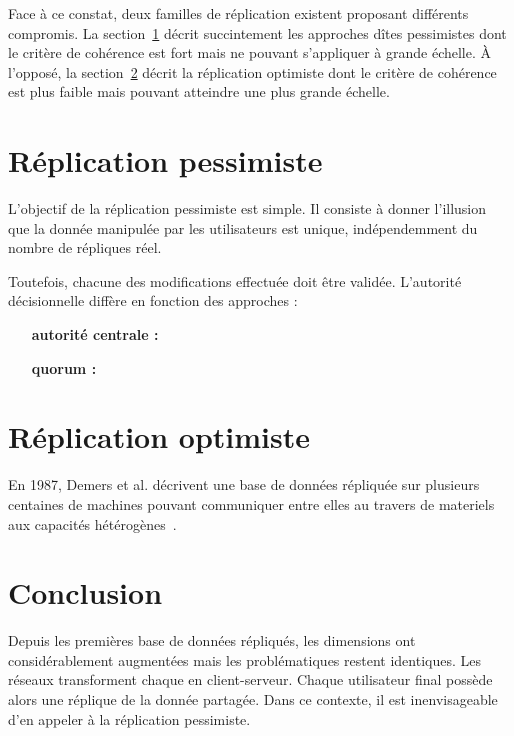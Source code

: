 Face à ce constat, deux familles de réplication existent proposant différents
compromis. La section~\ref{repl:sec:pessimistic} décrit succintement les
approches dîtes pessimistes dont le critère de cohérence est fort mais ne
pouvant s'appliquer à grande échelle. À l'opposé, la
section~\ref{repl:sec:optimistic} décrit la réplication optimiste dont le
critère de cohérence est plus faible mais pouvant atteindre une plus grande
échelle.

\section{Réplication pessimiste}
\label{repl:sec:pessimistic}

L'objectif de la réplication pessimiste est simple. Il consiste à donner
l'illusion que la donnée manipulée par les utilisateurs est unique,
indépendemment du nombre de répliques réel. 

Toutefois, chacune des modifications effectuée doit être validée. L'autorité
décisionnelle diffère en fonction des approches :
\begin{itemize}
\item [\textbf{autorité centrale :}]
\item [\textbf{quorum :}]
\end{itemize}

\section{Réplication optimiste}
\label{repl:sec:optimistic}

En 1987, Demers et al. décrivent une base de données répliquée sur plusieurs
centaines de machines pouvant communiquer entre elles au travers de materiels
aux capacités hétérogènes~\cite{demers1987epidemic}.

\section{Conclusion}

Depuis les premières base de données répliqués, les dimensions ont
considérablement augmentées mais les problématiques restent identiques. Les
réseaux  transforment chaque  en
client-serveur. Chaque utilisateur final possède alors une réplique de la donnée
partagée. Dans ce contexte, il est inenvisageable d'en appeler à la réplication
pessimiste. 




